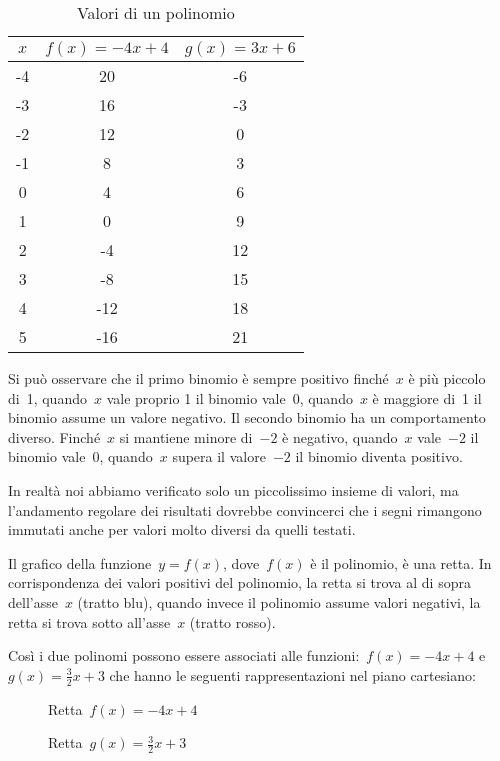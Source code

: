 \begin{table}[h!]
\label{tab:valoripolinomio}
\caption{Valori di un polinomio}
\center
\label{tab:valori}
 \begin{tabular}{c|c|c}
  $x$ & $f(x) = -4 x +4$ & $g(x) = 3 x +6$ \\
  \hline
  -4 &  20 & -6 \\
  -3 &  16 & -3 \\
  -2 &  12 &  0 \\
  -1 &   8 &  3 \\
   0 &   4 &  6 \\
   1 &   0 &  9 \\
   2 &  -4 & 12 \\
   3 &  -8 & 15 \\
   4 & -12 & 18 \\
   5 & -16 & 21
 \end{tabular}
\end{table}

Si può osservare che il primo binomio è sempre positivo finché~$x$ è più
piccolo di~1, quando~$x$ vale proprio 1 il binomio vale~0, quando~$x$ è
maggiore di~1 il binomio assume un valore negativo.
Il secondo binomio ha un comportamento diverso. Finché~$x$ si mantiene
minore di~$-2$ è negativo, quando~$x$ vale~$-2$ il binomio vale~0, quando~$x$
supera il valore~$-2$ il binomio diventa positivo.

In realtà noi abbiamo verificato solo un piccolissimo insieme di valori,
ma l'andamento regolare dei risultati dovrebbe convincerci che i segni
rimangono immutati anche per valori molto diversi da quelli testati.

Il grafico della funzione~$y=f(x)$, dove~$f(x)$ è il polinomio, è una retta.
In corrispondenza dei valori positivi del polinomio, la retta si trova al di
sopra dell'asse~$x$ (tratto blu), quando invece il polinomio assume valori
negativi, la retta si trova sotto all'asse~$x$ (tratto rosso).

Così i due polinomi possono essere associati alle
funzioni:~$f(x) = -4 x +4$ e~$g(x) = \frac{3}{2} x +3$ che hanno le seguenti
rappresentazioni nel piano cartesiano:

\begin{inaccessibleblock}
 \begin{figure}[h]
 \centering
 \begin{minipage}[]{.45\textwidth}
  \centering
  \caption{Retta~$f(x) = -4 x +4$}
 \end{minipage}
 \begin{minipage}[]{.45\textwidth}
  \centering
  \caption{Retta~$g(x) = \frac{3}{2} x +3$}
 \end{minipage}
\end{figure}
\end{inaccessibleblock}

